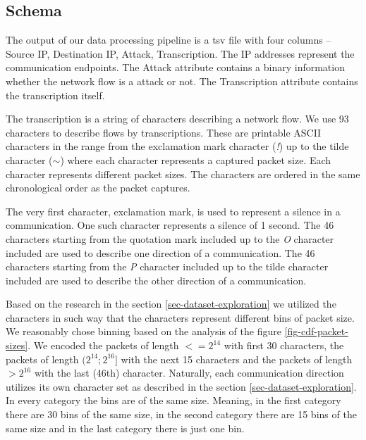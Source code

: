 \documentclass{article}
\begin{document}
\subsection{Schema}\label{sec-schema}
The output of our data processing pipeline is a tsv file with four columns -- Source IP, Destination IP, Attack, Transcription. The IP addresses represent the communication endpoints. The Attack attribute contains a binary information whether the network flow is a attack or not. The Transcription attribute contains the transcription itself.

The transcription is a string of characters describing a network flow. We use 93 characters to describe flows by transcriptions. These are printable ASCII characters in the range from the exclamation mark character (\textit{!}) up to the tilde character (\textit{$\sim$}) where each character represents a captured packet size. Each character represents different packet sizes. The characters are ordered in the same chronological order as the packet captures.

The very first character, exclamation mark, is used to represent a silence in a communication. One such character represents a silence of 1 second. The 46 characters starting from the quotation mark included up to the \textit{O} character included are used to describe one direction of a communication. The 46 characters starting from the \textit{P} character included up to the tilde character included are used to describe the other direction of a communication.

Based on the research in the section \ref{sec-dataset-exploration} we utilized the characters in such way that the characters represent different bins of packet size. We reasonably chose binning based on the analysis of the figure \ref{fig-cdf-packet-sizes}. We encoded the packets of length $<= 2^{14}$ with first 30 characters, the packets of length $(2^{14}; 2^{16}]$ with the next 15 characters and the packets of length $> 2^{16}$ with the last (46th) character. Naturally, each communication direction utilizes its own character set as described in the section \ref{sec-dataset-exploration}. In every category the bins are of the same size. Meaning, in the first category there are 30 bins of the same size, in the second category there are 15 bins of the same size and in the last category there is just one bin.
\end{document}

